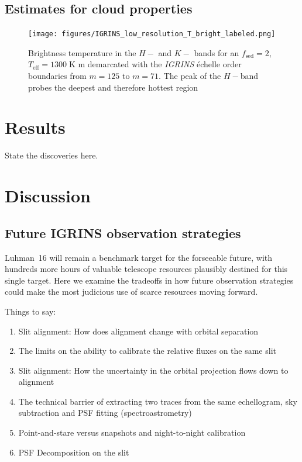 \documentclass[modern]{aastex631}
\begin{document}
\subsection{Estimates for cloud properties}

\begin{figure}[ht]
  \centering
    \texttt{[image: figures/IGRINS\_low\_resolution\_T\_bright\_labeled.png]} \\
\caption{Brightness temperature in the $H-$ and $K-$ bands for an $f_{\mathrm{sed}}=2$, $T_{\mathrm{eff}}=1300\;$K m demarcated with the \emph{IGRINS} \'echelle order boundaries from $m=125$ to $m=71$.  The peak of the $H-$band probes the deepest and therefore hottest region}
\label{fig:brightness_temp}
\end{figure}

\section{Results}
State the discoveries here.

\section{Discussion}

\subsection{Future IGRINS observation strategies}
Luhman~16 will remain a benchmark target for the forseeable future, with hundreds more hours of valuable telescope resources plausibly destined for this single target.  Here we examine the tradeoffs in how future observation strategies could make the most judicious use of scarce resources moving forward.

Things to say:  
\begin{enumerate}
  \item Slit alignment: How does alignment change with orbital separation  
  \item The limits on the ability to calibrate the relative fluxes on the same slit  
  \item Slit alignment: How the uncertainty in the orbital projection flows down to alignment  
  \item The technical barrier of extracting two traces from the same echellogram, sky subtraction and PSF fitting (spectroastrometry)  
  \item Point-and-stare versus snapshots and night-to-night calibration 
  \item PSF Decomposition on the slit  
\end{enumerate}
\end{document}
